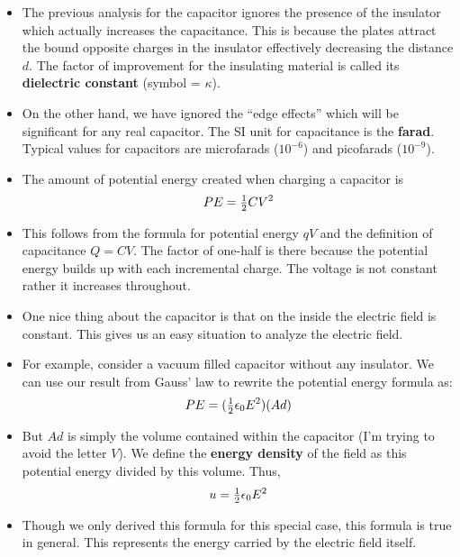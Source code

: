 \documentclass{article}
\begin{document}
%
\begin{itemize}

\item The previous analysis for the capacitor ignores the presence of the insulator which actually increases the capacitance. This is because the plates attract the bound opposite charges in the insulator effectively decreasing the distance $d$. The factor of improvement for the insulating material is called its \textbf{dielectric constant} (symbol = $\kappa$).

\item On the other hand, we have ignored the ``edge effects'' which will be significant for any real capacitor. The SI unit for capacitance is the \textbf{farad}. Typical values for capacitors are microfarads (\(10^{-6}\)) and picofarads (\(10^{-9}\)).

\item The amount of potential energy created when charging a capacitor is
%
\begin{equation*}
PE = \tfrac{1}{2} CV^2
\end{equation*}
\item This follows from the formula for potential energy $qV$ and the definition of capacitance $Q = CV$. The factor of one-half is there because the potential energy builds up with each incremental charge. The voltage is not constant rather it increases throughout.

\item One nice thing about the capacitor is that on the inside the electric field is constant. This gives us an easy situation to analyze the electric field.

\item For example, consider a vacuum filled capacitor without any insulator. We can use our result from Gauss' law to rewrite the potential energy formula as:
%
\begin{equation*}
PE = (\tfrac{1}{2} \epsilon_0 E^2)(Ad)
\end{equation*}
\item But $Ad$ is simply the volume contained within the capacitor (I'm trying to avoid the letter $V$). We define the \textbf{energy density} of the field as this potential energy divided by this volume. Thus,
%
\begin{equation*}
u = \tfrac{1}{2} \epsilon_0 E^2
\end{equation*}
\item Though we only derived this formula for this special case, this formula is true in general. This represents the energy carried by the electric field itself.

\end{itemize}
\end{document}
